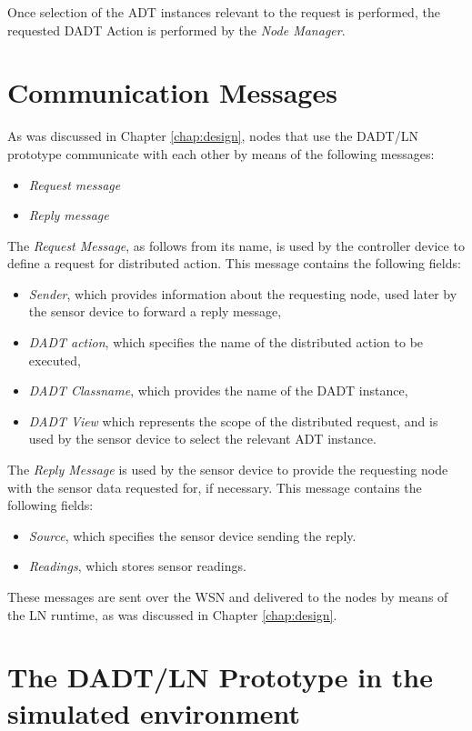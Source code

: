 Once selection of the ADT instances relevant to the request is performed, the
requested DADT Action is performed by the \emph{Node Manager}.

\section{Communication Messages} \label{sec:messages}

As was discussed in Chapter \ref{chap:design}, nodes that use the DADT/LN
prototype communicate with each other by means of the following
messages:
\begin{itemize}
  \item \emph{Request message}
  \item \emph{Reply message}
\end{itemize} 

The \emph{Request Message}, as follows from its name, is used by the controller
device to define a request for distributed action. This message contains 
the following fields: 
\begin{itemize}
  \item \emph{Sender}, which provides information about the requesting node,
  used later by the sensor device to forward a reply message,
  \item \emph{DADT action}, which specifies the name of the distributed
  action to be executed,
  \item \emph{DADT Classname}, which provides the name of the DADT instance,
  \item \emph{DADT View} which represents the scope of the distributed request,
  and is used by the sensor device to select the relevant  ADT instance.
\end{itemize}

The \emph{Reply Message} is used by the sensor device to provide the requesting node
with
the sensor data requested for, if necessary. This message contains the
following fields:
\begin{itemize}
  \item \emph{Source}, which specifies the sensor device sending the reply.
  \item \emph{Readings}, which stores sensor readings.  
\end{itemize}

These messages are sent over the WSN and delivered to the nodes by means of the
LN runtime, as was discussed in Chapter \ref{chap:design}.

\section{The DADT/LN Prototype in the simulated environment}


